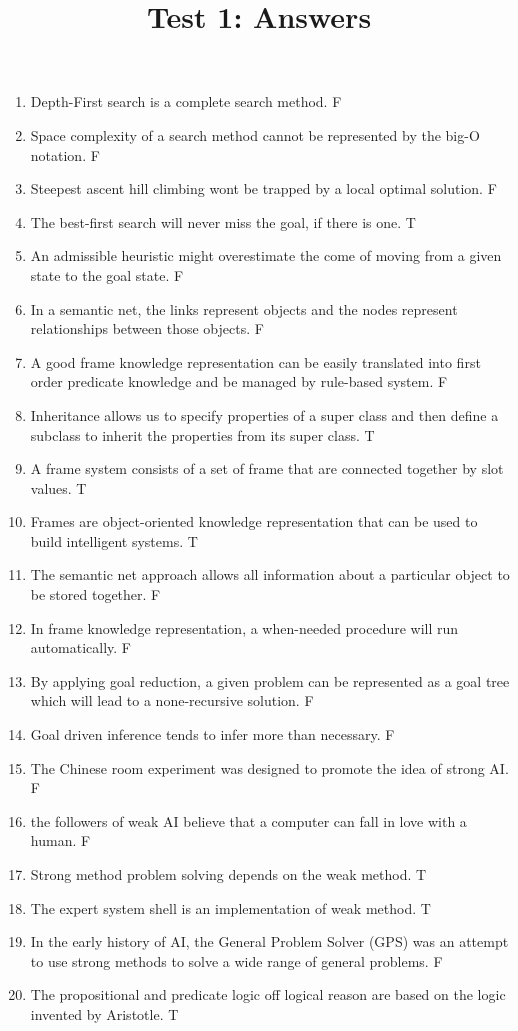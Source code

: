 \documentclass[a4paper]{article}
\begin{document}
	\title{Test 1: Answers}
	\maketitle
	\begin{enumerate}
		\item Depth-First search is a complete search method. F
		\item Space complexity of a search method cannot be represented by the big-O notation. F
		\item Steepest ascent hill climbing wont be trapped by a local optimal solution. F
		\item The best-first search will never miss the goal, if there is one. T
		\item An admissible heuristic might overestimate the come of moving from a given state to the goal state. F
		\item In a semantic net, the links represent objects and the nodes represent relationships between those objects. F
		\item A good frame knowledge representation can be easily translated into first order predicate knowledge and be managed by rule-based system. F
		\item Inheritance allows us to specify properties of a super class and then define a subclass to inherit the properties from its super class. T
		\item A frame system consists of a set of frame that are connected together by slot values. T
		\item Frames are object-oriented knowledge representation that can be used to build intelligent systems. T
		\item The semantic net approach allows all information about a particular object to be stored together. F
		\item In frame knowledge representation, a when-needed procedure will run automatically. F
		\item By applying goal reduction, a given problem can be represented as a goal tree which will lead to a none-recursive solution. F
		\item Goal driven inference tends to infer more than necessary. F
		\item The Chinese room experiment was designed to promote the idea of strong AI. F
		\item the followers of weak AI believe that a computer can fall in love with a human. F
		\item Strong method problem solving depends on the weak method. T
		\item The expert system shell is an implementation of weak method. T
		\item In the early history of AI, the General Problem Solver (GPS) was an attempt to use strong methods to solve a wide range of general problems. F
		\item The propositional and predicate logic off logical reason are based on the logic invented by Aristotle. T
	\end{enumerate}
\end{document}
